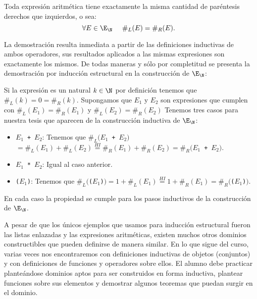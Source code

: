 	\begin{teorema}
	Toda expresión aritmética tiene exactamente la misma cantidad de paréntesis derechos que izquierdos, o sea:
	\[
	\forall E\in\E_\N\;\;\;\;\; \#_L(E)=\#_R(E).
	\]
	\begin{demostracion}
	La demostración resulta inmediata a partir de las definiciones inductivas de ambos operadores, sus resultados aplicados a las mismas expresiones son exactamente los mismos.
	De todas maneras y sólo por completitud se presenta la demostración por inducción estructural en la construcción de $\E_\N$:
	\begin{inducciondemo}
	  \BI Si la expresión es un natural $k\in\N$ por definición tenemos que $\#_L(k)=0=\#_R(k)$.
	  \HI Supongamos que $E_1$ y $E_2$ son expresiones que cumplen con $\#_L(E_1)=\#_R(E_1)$ y $\#_L(E_2)=\#_R(E_2)$
	  \TI Tenemos tres casos para nuestra tesis que aparecen de la construcción inductiva de $\E_\N$:
	  \begin{itemize}
	    \item \texttt{$E_1$ + $E_2$}: Tenemos que \texttt{$\#_L(E_1$ + $E_2)$}$=\#_L(E_1) + \#_L(E_2)\stackrel{HI}{=}\#_R(E_1) + \#_R(E_2)=$\texttt{$\#_R(E_1$ + $E_2)$}.
	    \item \texttt{$E_1$ * $E_2$}: Igual al caso anterior.
	    \item \texttt{($E_1$)}: Tenemos que \texttt{$\#_L($($E_1$)$)=1+\#_L(E_1)\stackrel{HI}{=}1+\#_R(E_1)=\#_R($($E_1$)$)$}.
	  \end{itemize}
	\end{inducciondemo}
	En cada caso la propiedad se cumple para los pasos inductivos de la construcción de $\E_\N$.
	\end{demostracion}
	\end{teorema}
	  
A pesar de que los únicos ejemplos que usamos para inducción estructural fueron las listas enlazadas y las expresiones aritméticas, existen muchos otros dominios constructibles que pueden definirse de manera similar.
En lo que sigue del curso, varias veces nos encontraremos con definiciones inductivas de objetos (conjuntos) y con definiciones de funciones y operadores sobre ellos.
El alumno debe practicar planteándose dominios aptos para ser construidos en forma inductiva, plantear funciones sobre sus elementos y demostrar algunos teoremas que puedan surgir en el dominio.
